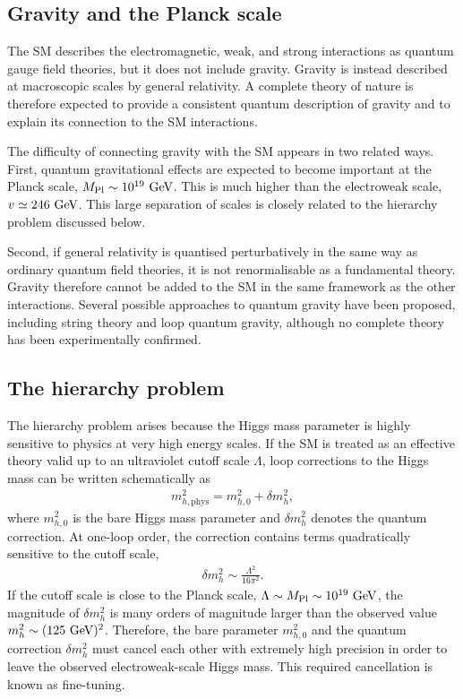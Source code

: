 \subsection{Gravity and the Planck scale}
\label{subsec:gravity_planck_scale}

The SM describes the electromagnetic, weak, and strong interactions as quantum gauge field theories, but it does not include gravity. 
Gravity is instead described at macroscopic scales by general relativity. 
A complete theory of nature is therefore expected to provide a consistent quantum description of gravity and to explain its connection to the SM interactions.

The difficulty of connecting gravity with the SM appears in two related ways. 
First, quantum gravitational effects are expected to become important at the Planck scale, $M_{\mathrm{Pl}}\sim10^{19}~\mathrm{GeV}$. This is much higher than the electroweak scale, $v\simeq246~\mathrm{GeV}$.
This large separation of scales is closely related to the hierarchy problem discussed below.

Second, if general relativity is quantised perturbatively in the same way as ordinary quantum field theories, it is not renormalisable as a fundamental theory. 
Gravity therefore cannot be added to the SM in the same framework as the other interactions. 
Several possible approaches to quantum gravity have been proposed, including string theory and loop quantum gravity, although no complete theory has been experimentally confirmed.

\subsection{The hierarchy problem}
\label{subsec:hierarchy_problem}

The hierarchy problem arises because the Higgs mass parameter is highly sensitive to physics at very high energy scales. 
If the SM is treated as an effective theory valid up to an ultraviolet cutoff scale $\Lambda$, loop corrections to the Higgs mass can be written schematically as
\begin{align*}
    m_{h,\mathrm{phys}}^{2}
    =
    m_{h,0}^{2}
    +
    \delta m_{h}^{2},
\end{align*}
where $m_{h,0}^{2}$ is the bare Higgs mass parameter and $\delta m_{h}^{2}$ denotes the quantum correction. 
At one-loop order, the correction contains terms quadratically sensitive to the cutoff scale,
\begin{align*}
    \delta m_{h}^{2}
    \sim
    \frac{\Lambda^{2}}{16\pi^{2}}.
\end{align*}
If the cutoff scale is close to the Planck scale, $\Lambda\sim M_{\mathrm{Pl}}\sim10^{19}~\mathrm{GeV}$, the magnitude of $\delta m_{h}^{2}$ is many orders of magnitude larger than the observed value $m_{h}^{2}\sim(125~\mathrm{GeV})^{2}$. 
Therefore, the bare parameter $m_{h,0}^{2}$ and the quantum correction $\delta m_{h}^{2}$ must cancel each other with extremely high precision in order to leave the observed electroweak-scale Higgs mass. 
This required cancellation is known as fine-tuning.

